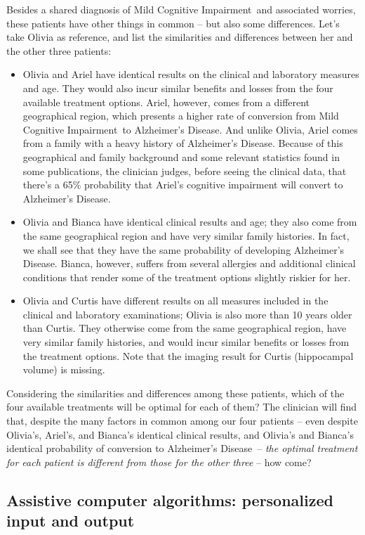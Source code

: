 \documentclass[utf8]{FrontiersinHarvard_mod} %
\renewcommand*{\|}[1][]{\nonscript\:#1\vert\nonscript\:\mathopen{}}
\newcommand*{\ad}{Alzheimer's Disease}
\newcommand*{\mci}{Mild Cognitive Impairment}
\begin{document}
Besides a shared diagnosis of \mci\ and associated worries, these patients have other things in common -- but also some differences. Let's take Olivia as reference, and list the similarities and differences between her and the other three patients:
\begin{itemize}
\item Olivia and Ariel have identical results on the clinical and laboratory measures and age. They would also incur similar benefits and losses from the four available treatment options. Ariel, however, comes from a different geographical region, which presents a higher rate of conversion from \mci\ to \ad. And unlike Olivia, Ariel comes from a family with a heavy history of \ad. Because of this geographical and family background and some relevant statistics found in some publications, the clinician judges, before seeing the clinical data, that there's a 65\% probability that Ariel's cognitive impairment will convert to \ad.

\item Olivia and Bianca have identical clinical results and age; they also come from the same geographical region and have very similar family histories. In fact, we shall see that they have the same probability of developing \ad. Bianca, however, suffers from several allergies and additional clinical conditions that render some of the treatment options slightly riskier for her.

\item Olivia and Curtis have different results on all measures included in the clinical and laboratory examinations; Olivia is also more than 10 years older than Curtis. They otherwise come from the same geographical region, have very similar family histories, and would incur similar benefits or losses from the treatment options. Note that the imaging result for Curtis (hippocampal volume) is missing.
\end{itemize}

Considering the similarities and differences among these patients, which of the four available treatments will be optimal for each of them? The clinician will find that, despite the many factors in common among our four patients -- even despite Olivia's, Ariel's, and Bianca's identical clinical results, and Olivia's and Bianca's identical probability of conversion to \ad\ -- \emph{the optimal treatment for each patient is different from those for the other three} -- how come?

\subsection{Assistive computer algorithms: personalized input and output}
\label{sec:intro_purposes}
\end{document}
